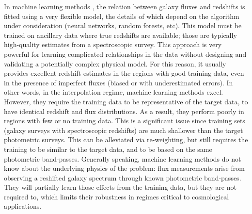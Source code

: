 \documentclass[aps,prd,showpacs,superscriptaddress,groupedaddress]{revtex4}  %
\begin{document}
In machine learning methods \citep[\eg][]{Kind:2013eka, Collister:2003cz, Sadeh:2015lsa}, the relation between galaxy fluxes and redshifts is fitted using a very flexible model, the details of which depend on the algorithm under consideration (\eg neural networks, random forests, etc).
This model must be trained on ancillary data where true redshifts are available; those are typically high-quality estimates from a spectroscopic survey.
This approach is very powerful for learning complicated relationships in the data without designing and validating a potentially complex physical model.
For this reason, it usually provides excellent redshift estimates in the regions with good training data, even in the presence of imperfect fluxes (\ie biased or with underestimated errors).
In other words, in the interpolation regime, machine learning methods excel.
However, they require the training data to be representative of the target data, \ie to have identical redshift and flux distributions.
As a result, they perform poorly in regions with few or no training data.
This is a significant issue since training sets (\ie galaxy surveys with spectroscopic redshifts) are much shallower than the target photometric surveys.
This can be alleviated via re-weighting, but still requires the training to be similar to the target data, and to be based on the same photometric band-passes.
Generally speaking, machine learning methods do not know about the underlying physics of the problem: flux measurements arise from observing a reshifted galaxy spectrum through known photometric band-passes.
They will partially learn those effects from the training data, but they are not required to, which limits their robustness in regimes critical to cosmological applications.
\end{document}
